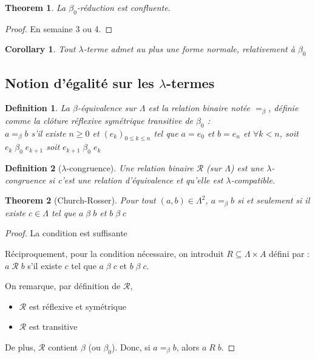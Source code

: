 \documentclass{article}
\newtheorem{thm}{Theorem}
\newtheorem{defi}{Definition}
\newtheorem{coro}{Corollary}
\newcommand\tlambda[0]{$\lambda$}
\begin{document}
\begin{thm}
La $\beta_0$-réduction est confluente.
\end{thm}
\begin{proof}
En semaine 3 ou 4.
\end{proof}

\begin{coro}
Tout $\lambda$-terme admet au plus une forme normale, relativement à $\beta_0$
\end{coro}

\subsection*{Notion d'égalité sur les \tlambda-termes}

\begin{defi}
La $\beta$-équivalence sur $\Lambda$ est la relation binaire notée $=_\beta$, définie comme la clôture réflexive symétrique transitive de $\beta_0$ :\\
$a=_\beta b$ s'il existe $n\geq 0$ et $(e_k)_{0\leq k \leq n}$ tel que $a=e_0$ et $b=e_n$ et $\forall k<n$, soit $e_k \; \beta_0 \; e_{k+1}$ soit $e_{k+1} \; \beta_0 \; e_{k}$
\end{defi}

\begin{defi}[\tlambda-congruence]
Une relation binaire $\mathcal{R}$ (sur $\Lambda$) est une \tlambda-congruence si c'est une relation d'équivalence et qu'elle est \tlambda-compatible.
\end{defi}

\begin{thm}[Church-Rosser]
Pour tout $(a,b)\in \Lambda^2$, $a=_\beta b$ si et seulement si il existe $c\in \Lambda$ tel que $a \; \beta \; b$ et $b \; \beta \; c$
\end{thm}

\begin{proof}
La condition est suffisante
\bigskip

Réciproquement, pour la condition nécessaire, on introduit $R\subseteq \Lambda \times A$ défini par :\\
$a \; \mathcal{R} \; b$ s'il existe $c$ tel que $a\; \beta \; c$ et $b \; \beta \; c$.

On remarque, par définition de $\mathcal{R}$,
\begin{itemize}
\item $\mathcal{R}$ est réflexive et symétrique
\item $\mathcal{R}$ est transitive
\end{itemize}
De plus, $\mathcal{R}$ contient $\beta$ (ou $\beta_0$). Donc, si $a=_\beta b$, alors $a\; R \; b$.
\end{proof}
\end{document}
